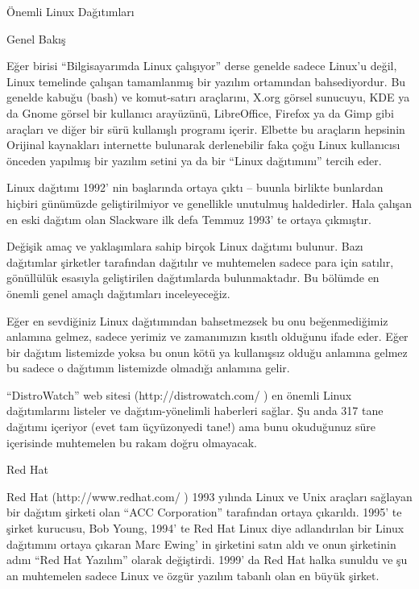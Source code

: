 \documentclass[10pt,a5paper]{book}
\begin{document}
\begin{section}{Önemli Linux Dağıtımları}
\begin{subsection}{Genel Bakış}

Eğer birisi “Bilgisayarımda Linux çalışıyor” derse genelde sadece Linux'u değil, Linux temelinde çalışan tamamlanmış bir yazılım ortamından bahsediyordur. Bu genelde kabuğu (bash) ve komut-satırı araçlarını, X.org görsel sunucuyu, KDE ya da Gnome görsel bir kullanıcı arayüzünü, LibreOffice, Firefox ya da Gimp gibi araçları ve diğer bir sürü kullanışlı programı içerir. Elbette bu araçların hepsinin Orijinal kaynakları internette bulunarak derlenebilir faka çoğu Linux kullanıcısı önceden yapılmış bir yazılım setini ya da bir “Linux dağıtımını” tercih eder.

Linux dağıtımı 1992' nin başlarında ortaya çıktı -- buunla birlikte bunlardan hiçbiri günümüzde geliştirilmiyor ve genellikle unutulmuş haldedirler. Hala çalışan en eski dağıtım olan Slackware ilk defa Temmuz 1993' te ortaya çıkmıştır.

Değişik amaç ve yaklaşımlara sahip birçok Linux dağıtımı bulunur. Bazı dağıtımlar şirketler tarafından dağıtılır ve muhtemelen sadece para için satılır, gönüllülük esasıyla geliştirilen dağıtımlarda bulunmaktadır. Bu bölümde en önemli genel amaçlı dağıtımları inceleyeceğiz.

Eğer en sevdiğiniz Linux dağıtımından bahsetmezsek bu onu beğenmediğimiz anlamına gelmez, sadece yerimiz ve zamanımızın kısıtlı olduğunu ifade eder. Eğer bir dağıtım listemizde yoksa bu onun kötü ya kullanışsız olduğu anlamına gelmez bu sadece o dağıtımın listemizde olmadığı anlamına gelir.

“DistroWatch” web sitesi (http://distrowatch.com/ ) en önemli Linux dağıtımlarını listeler ve dağıtım-yönelimli haberleri sağlar. Şu anda 317 tane dağıtımı içeriyor (evet tam üçyüzonyedi tane!) ama bunu okuduğunuz süre içerisinde muhtemelen bu rakam doğru olmayacak.
\end{subsection}
\begin{subsection}{Red Hat}

Red Hat (http://www.redhat.com/ ) 1993 yılında Linux ve Unix araçları sağlayan bir dağıtım şirketi olan “ACC Corporation” tarafından ortaya çıkarıldı. 1995' te şirket kurucusu, Bob Young, 1994' te Red Hat Linux diye adlandırılan bir Linux dağıtımını ortaya çıkaran Marc Ewing' in şirketini satın aldı ve onun şirketinin adını “Red Hat Yazılım” olarak değiştirdi. 1999' da Red Hat halka sunuldu ve şu an muhtemelen sadece Linux ve özgür yazılım tabanlı olan en büyük şirket.


\end{subsection}
\end{section}
\end{document}
